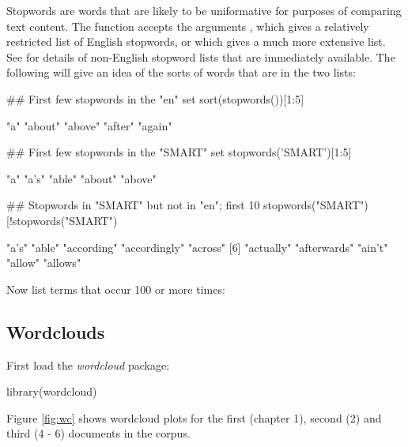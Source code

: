 Stopwords are words that are likely to be uniformative for purposes
of comparing text content.  The function  
accepts the arguments , which gives a relatively
restricted list of English stopwords, or  which
gives a much more extensive list.  See  for
details of non-English stopword lists that are immediately available.
The following will give an idea of the sorts of words that are in
the two lists:
\begin{Schunk}
\begin{Sinput}
## First few stopwords in the "en" set
sort(stopwords())[1:5]
\end{Sinput}
\begin{Soutput}
[1] "a"     "about" "above" "after" "again"
\end{Soutput}
\begin{Sinput}
## First few stopwords in the "SMART" set 
stopwords('SMART')[1:5]
\end{Sinput}
\begin{Soutput}
[1] "a"     "a's"   "able"  "about" "above"
\end{Soutput}
\begin{Sinput}
## Stopwords in "SMART" but not in "en"; first 10
stopwords("SMART")[!stopwords("SMART")%
\end{Sinput}
\begin{Soutput}
 [1] "a's"         "able"        "according"   "accordingly" "across"     
 [6] "actually"    "afterwards"  "ain't"       "allow"       "allows"     
\end{Soutput}
\end{Schunk}

Now list terms that occur 100 or more times:
\begin{fullwidth}

\end{fullwidth}

\subsection*{Wordclouds}

First load the {\em wordcloud} package:
\begin{Schunk}
\begin{Sinput}
library(wordcloud)
\end{Sinput}
\end{Schunk}

Figure \ref{fig:wc} shows wordcloud plots for the first (chapter 1),
second (2) and third (4 - 6) documents in the corpus.
\vspace*{15pt}

